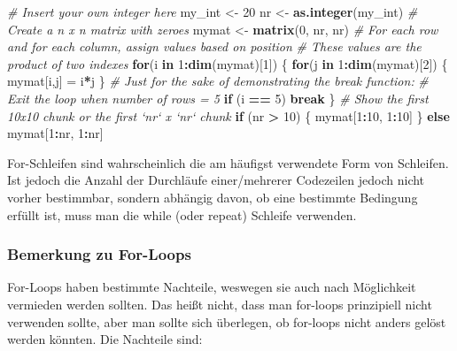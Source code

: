 \documentclass[]{article}
\newenvironment{Shaded}{\begin{snugshade}}{\end{snugshade}}
\newcommand{\KeywordTok}[1]{\textcolor[rgb]{0.13,0.29,0.53}{\textbf{#1}}}
\newcommand{\DecValTok}[1]{\textcolor[rgb]{0.00,0.00,0.81}{#1}}
\newcommand{\StringTok}[1]{\textcolor[rgb]{0.31,0.60,0.02}{#1}}
\newcommand{\CommentTok}[1]{\textcolor[rgb]{0.56,0.35,0.01}{\textit{#1}}}
\newcommand{\ControlFlowTok}[1]{\textcolor[rgb]{0.13,0.29,0.53}{\textbf{#1}}}
\newcommand{\OperatorTok}[1]{\textcolor[rgb]{0.81,0.36,0.00}{\textbf{#1}}}
\newcommand{\NormalTok}[1]{#1}
\begin{document}
\begin{Shaded}
\begin{Highlighting}[]
  \CommentTok{# Insert your own integer here}
\NormalTok{  my_int <-}\StringTok{ }\DecValTok{20}
\NormalTok{  nr     <-}\StringTok{ }\KeywordTok{as.integer}\NormalTok{(my_int)}
  \CommentTok{# Create a n x n matrix with zeroes}
\NormalTok{  mymat <-}\StringTok{ }\KeywordTok{matrix}\NormalTok{(}\DecValTok{0}\NormalTok{, nr, nr)}
  \CommentTok{# For each row and for each column, assign values based on position}
  \CommentTok{# These values are the product of two indexes}
  \ControlFlowTok{for}\NormalTok{(i }\ControlFlowTok{in} \DecValTok{1}\OperatorTok{:}\KeywordTok{dim}\NormalTok{(mymat)[}\DecValTok{1}\NormalTok{]) \{}
    \ControlFlowTok{for}\NormalTok{(j }\ControlFlowTok{in} \DecValTok{1}\OperatorTok{:}\KeywordTok{dim}\NormalTok{(mymat)[}\DecValTok{2}\NormalTok{]) \{}
\NormalTok{      mymat[i,j] =}\StringTok{ }\NormalTok{i}\OperatorTok{*}\NormalTok{j}
\NormalTok{    \}}
    \CommentTok{# Just for the sake of demonstrating the break function:}
    \CommentTok{# Exit the loop when number of rows = 5}
    \ControlFlowTok{if}\NormalTok{ (i }\OperatorTok{==}\StringTok{ }\DecValTok{5}\NormalTok{) }\ControlFlowTok{break}
\NormalTok{  \}}
  \CommentTok{# Show the first 10x10 chunk or the first `nr` x `nr` chunk}
  \ControlFlowTok{if}\NormalTok{ (nr }\OperatorTok{>}\StringTok{ }\DecValTok{10}\NormalTok{) \{}
\NormalTok{    mymat[}\DecValTok{1}\OperatorTok{:}\DecValTok{10}\NormalTok{, }\DecValTok{1}\OperatorTok{:}\DecValTok{10}\NormalTok{]}
\NormalTok{  \} }\ControlFlowTok{else}\NormalTok{ mymat[}\DecValTok{1}\OperatorTok{:}\NormalTok{nr, }\DecValTok{1}\OperatorTok{:}\NormalTok{nr]}
\end{Highlighting}
\end{Shaded}

For-Schleifen sind wahrscheinlich die am häufigst verwendete Form von
Schleifen. Ist jedoch die Anzahl der Durchläufe einer/mehrerer
Codezeilen jedoch nicht vorher bestimmbar, sondern abhängig davon, ob
eine bestimmte Bedingung erfüllt ist, muss man die while (oder repeat)
Schleife verwenden.

\subsubsection*{Bemerkung zu For-Loops}\label{bemerkung-zu-for-loops}

For-Loops haben bestimmte Nachteile, weswegen sie auch nach Möglichkeit
vermieden werden sollten. Das heißt nicht, dass man for-loops
prinzipiell nicht verwenden sollte, aber man sollte sich überlegen, ob
for-loops nicht anders gelöst werden könnten. Die Nachteile sind:
\end{document}
